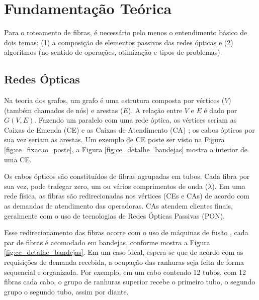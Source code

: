 \section{Fundamentação Teórica} \label{sec:fundaments}

Para o roteamento de fibras, é necessário pelo menos o entendimento básico de
dois temas: (1) a composição de elementos passivos das redes ópticas e (2)
algoritmos (no sentido de operações, otimização e tipos de problemas).

\subsection{Redes Ópticas}

Na teoria dos grafos, um grafo é uma estrutura composta por vértices ($V$)
(também chamados de nós) e arestas ($E$). A relação entre $V$ e $E$ é dado por
$G(V,E)$. Fazendo um paralelo com uma rede óptica, os vértices seriam as Caixas
de Emenda (CE) e as Caixas de Atendimento (CA) \cite{maeda2009optical}; os
cabos ópticos por sua vez seriam as arestas. Um exemplo de CE poste ser visto
na Figura \ref{fig:ce_fixacao_poste}, a Figura \ref{fig:ce_detalhe_bandejas}
mostra o interior de uma CE.

Os cabos ópticos são constituídos de fibras agrupadas em tubos. Cada fibra por
sua vez, pode trafegar zero, um ou vários comprimentos de onda ($\lambda$).
Em uma rede física, as fibras são redirecionadas nos vértices (CEs e CAs) de
acordo com as demandas de atendimento das operadoras. CAs atendem clientes finais,
geralmente com o uso de tecnologias de Redes Ópticas Passivas (PON).

Esse redirecionamento das fibras ocorre com o uso de máquinas de fusão
\cite{maeda2009optical}, cada par de fibras é acomodado em bandejas, conforme
mostra a Figura \ref{fig:ce_detalhe_bandejas}. Em um caso ideal, espera-se que
de acordo com as requisições de demanda recebida, a ocupação das ranhuras seja
feita de forma sequencial e organizada. Por exemplo, em um cabo contendo 12
tubos, com 12 fibras cada cabo, o grupo de ranhuras superior recebe o primeiro
tubo, o segundo grupo o segundo tubo, assim por diante.


